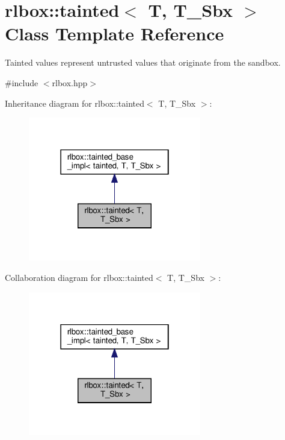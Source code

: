 \hypertarget{classrlbox_1_1tainted}{}\section{rlbox\+:\+:tainted$<$ T, T\+\_\+\+Sbx $>$ Class Template Reference}
\label{classrlbox_1_1tainted}


Tainted values represent untrusted values that originate from the sandbox.  




{\ttfamily \#include $<$rlbox.\+hpp$>$}



Inheritance diagram for rlbox\+:\+:tainted$<$ T, T\+\_\+\+Sbx $>$\+:\nopagebreak
\begin{figure}[H]
\begin{center}
\leavevmode
\includegraphics[width=214pt]{classrlbox_1_1tainted__inherit__graph}
\end{center}
\end{figure}


Collaboration diagram for rlbox\+:\+:tainted$<$ T, T\+\_\+\+Sbx $>$\+:\nopagebreak
\begin{figure}[H]
\begin{center}
\leavevmode
\includegraphics[width=214pt]{classrlbox_1_1tainted__coll__graph}
\end{center}
\end{figure}
